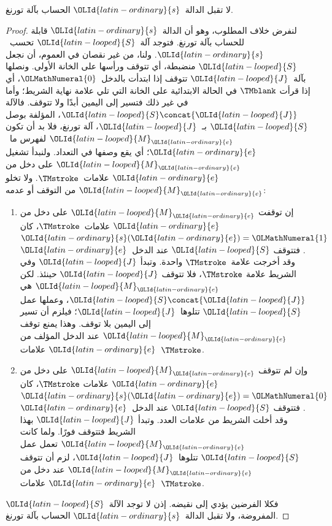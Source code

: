 \documentclass[../../../include/open-logic-section]{subfiles}
\begin{document}
\begin{lem}
لا تقبل الدالة~${\OLId{latin-ordinary}{s}}$ الحساب بآلة تورنغ.
\end{lem}

\begin{proof}
لنفرض خلاف المطلوب، وهو أن الدالة~${\OLId{latin-ordinary}{s}}$ قابلة للحساب بآلة تورنغ.
فتوجد آلة~${\OLId{latin-looped}{S}}$ تحسب~${\OLId{latin-ordinary}{s}}$. ولنا، من غير نقصان في العموم، أن نجعل
${\OLId{latin-looped}{S}}$ منضبطة، أي تتوقف ورأسها على الخانة الأولى. ونصلها بآلة~${\OLId{latin-looped}{J}}$
تتوقف إذا ابتدأت بالدخل~${\OLMathNumeral{0}}$، أي إذا قرأت $\TMblank$ في الحالة
الابتدائية على الخانة التي تلي علامة نهاية الشريط؛ وأما في غير
ذلك فتسير إلى اليمين أبدًا ولا تتوقف. فالآلة ${\OLId{latin-looped}{S}}\concat {\OLId{latin-looped}{J}}$،
المؤلفة بوصل ${\OLId{latin-looped}{S}}$ بـ~${\OLId{latin-looped}{J}}$، آلة تورنغ، فلا بد أن تكون ${\OLId{latin-looped}{M}}_{\OLId{latin-ordinary}{e}}$
لفهرس ما~${\OLId{latin-ordinary}{e}}$؛ أي يقع وصفها في التعداد. ولنبدأ تشغيل ${\OLId{latin-looped}{M}}_{\OLId{latin-ordinary}{e}}$
على دخل من ${\OLId{latin-ordinary}{e}}$ علامات~$\TMstroke$. ولا تخلو ${\OLId{latin-looped}{M}}_{\OLId{latin-ordinary}{e}}$ من التوقف
أو عدمه:
\begin{enumerate}
\item إن توقفت ${\OLId{latin-looped}{M}}_{\OLId{latin-ordinary}{e}}$ على دخل من ${\OLId{latin-ordinary}{e}}$ علامات~$\TMstroke$،
  كان ${\OLId{latin-ordinary}{s}}({\OLId{latin-ordinary}{e}})={\OLMathNumeral{1}}$. فتتوقف ${\OLId{latin-looped}{S}}$ عند الدخل~${\OLId{latin-ordinary}{e}}$ وقد أخرجت
  علامة~$\TMstroke$ واحدة. وتبدأ ${\OLId{latin-looped}{J}}$ وفي الشريط علامة
  $\TMstroke$، فلا تتوقف ${\OLId{latin-looped}{J}}$ حينئذ. لكن ${\OLId{latin-looped}{M}}_{\OLId{latin-ordinary}{e}}$ هي
  ${\OLId{latin-looped}{S}}\concat {\OLId{latin-looped}{J}}$، وعملها عمل ${\OLId{latin-looped}{S}}$ تتلوها~${\OLId{latin-looped}{J}}$؛ فيلزم أن تسير
  إلى اليمين بلا توقف. وهذا يمنع توقف ${\OLId{latin-looped}{M}}_{\OLId{latin-ordinary}{e}}$ عند الدخل المؤلف
  من ${\OLId{latin-ordinary}{e}}$ علامات~$\TMstroke$.

\item وإن لم تتوقف ${\OLId{latin-looped}{M}}_{\OLId{latin-ordinary}{e}}$ على دخل من ${\OLId{latin-ordinary}{e}}$ علامات
  $\TMstroke$، كان ${\OLId{latin-ordinary}{s}}({\OLId{latin-ordinary}{e}})={\OLMathNumeral{0}}$. فتتوقف ${\OLId{latin-looped}{S}}$ عند الدخل~${\OLId{latin-ordinary}{e}}$
  وقد أخلت الشريط من علامات العدد. وتبدأ ${\OLId{latin-looped}{J}}$ بهذا الشريط فتتوقف
  فورًا. ولما كانت ${\OLId{latin-looped}{M}}_{\OLId{latin-ordinary}{e}}$ تعمل عمل ${\OLId{latin-looped}{S}}$ تتلوها~${\OLId{latin-looped}{J}}$، لزم أن
  تتوقف ${\OLId{latin-looped}{M}}_{\OLId{latin-ordinary}{e}}$ عند دخل من ${\OLId{latin-ordinary}{e}}$ علامات~$\TMstroke$.
\end{enumerate}
فكلا الفرضين يؤدي إلى نقيضه. إذن لا توجد الآلة~${\OLId{latin-looped}{S}}$ المفروضة،
ولا تقبل الدالة~${\OLId{latin-ordinary}{s}}$ الحساب بآلة تورنغ.
\end{proof}
\end{document}
